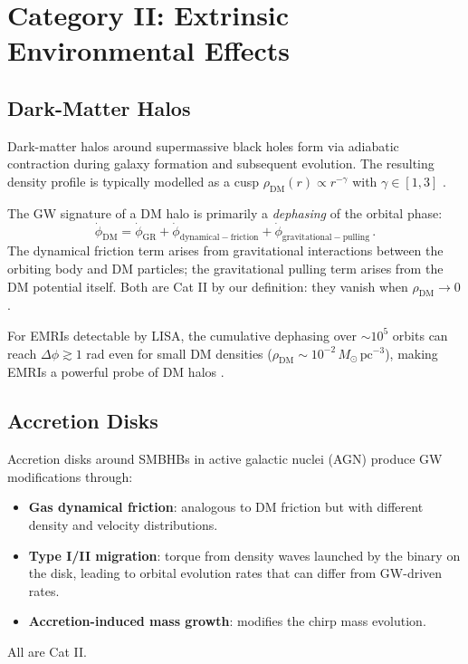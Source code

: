 \documentclass[11pt]{article}
\begin{document}
\section{Category II: Extrinsic Environmental Effects}\label{sec:cat2}

\subsection{Dark-Matter Halos}

Dark-matter halos around supermassive black holes form via adiabatic contraction during galaxy formation and subsequent evolution. The resulting density profile is typically modelled as a cusp $\rho_{\mathrm{DM}}(r) \propto r^{-\gamma}$ with $\gamma \in [1, 3]$ \cite{Gondolo:2003,Barausse:2020}.

The GW signature of a DM halo is primarily a \emph{dephasing} of the orbital phase:
\begin{equation}
\dot{\phi}_{\mathrm{DM}} = \dot{\phi}_{\mathrm{GR}} + \dot{\phi}_{\mathrm{dynamical-friction}} + \dot{\phi}_{\mathrm{gravitational-pulling}}\,.
\end{equation}
The dynamical friction term arises from gravitational interactions between the orbiting body and DM particles; the gravitational pulling term arises from the DM potential itself. Both are Cat II by our definition: they vanish when $\rho_{\mathrm{DM}} \to 0$.

For EMRIs detectable by LISA, the cumulative dephasing over $\sim 10^5$ orbits can reach $\Delta\phi \gtrsim 1$ rad even for small DM densities ($\rho_{\mathrm{DM}} \sim 10^{-2}\,M_\odot\,\mathrm{pc}^{-3}$), making EMRIs a powerful probe of DM halos \cite{Gair:2013,Tang:2018}.

\subsection{Accretion Disks}

Accretion disks around SMBHBs in active galactic nuclei (AGN) produce GW modifications through:
\begin{itemize}
\item \textbf{Gas dynamical friction}: analogous to DM friction but with different density and velocity distributions.
\item \textbf{Type I/II migration}: torque from density waves launched by the binary on the disk, leading to orbital evolution rates that can differ from GW-driven rates.
\item \textbf{Accretion-induced mass growth}: modifies the chirp mass evolution.
\end{itemize}
All are Cat II.
\end{document}
